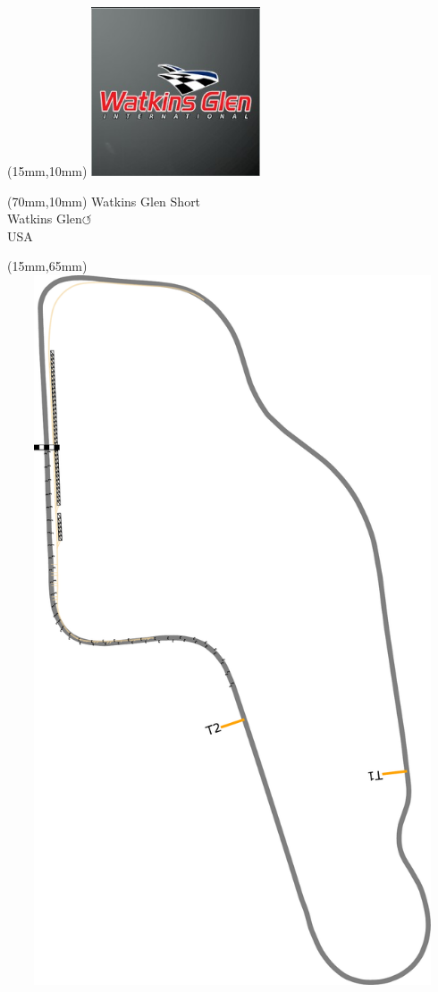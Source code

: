 \null\newpage
\begin{textblock*}{50mm}(15mm,10mm)%
\includegraphics[width=50mm]{LG/2015-05-20_00097.png}
\end{textblock*}
\begin{textblock*}{130mm}(70mm,10mm)%
{\fontsize{20}{20}\selectfont Watkins Glen Short\\}
{\fontsize{16}{16}\selectfont Watkins Glen\hfill \huge$\circlearrowleft$\\}
{\fontsize{12}{12}\selectfont USA\\}
\end{textblock*}
\begin{textblock*}{185mm}(15mm,65mm)%
\centering
\mbox{\includegraphics[width=185mm,height=210mm,keepaspectratio]{PT/WAGLSH.pdf}}
\end{textblock*}
